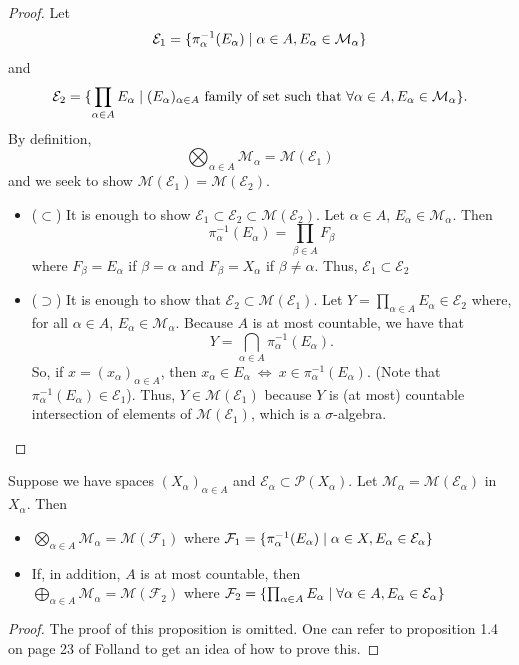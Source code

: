 \documentclass[11pt,leqno,oneside]{amsbook}
\numberwithin{thm}{section}
\renewcommand{\P}{\mathcal{P}} %
\newcommand{\M}{\mathcal{M}} %
\newcommand{\F}{\mathcal{F}}
\newcommand{\Ep}{\mathcal{E}} %
\newcommand{\s}{$\sigma$-} %
\begin{document}
\begin{proof}
  Let \[
    \Ep_1 = \{\pi_\alpha^{-1}(E_\alpha) \st \alpha \in A, E_\alpha
    \in \M_\alpha\}
  \]
  and \[
    \Ep_2 = \{\prod_{\alpha \in A} E_\alpha \st (E_\alpha)_{\alpha
      \in A} \text{ family of set such that } \forall \alpha \in A,
    E_\alpha \in \M_\alpha \}.
  \]
  By definition, \[
    \bigotimes_{\alpha \in A} \M_\alpha = \M(\Ep_1)
  \]
  and we seek to show $\M(\Ep_1) = \M(\Ep_2)$.
  \begin{itemize}
  \item ($\subset$) It is enough to show $\Ep_1 \subset \Ep_2 \subset
    \M(\Ep_2)$. Let $\alpha \in A$, $E_\alpha \in \M_\alpha$. Then \[
      \pi_\alpha^{-1}(E_\alpha) = \prod_{\beta \in A} F_\beta
    \]
    where $F_\beta = E_\alpha$ if $\beta = \alpha$ and $F_\beta =
    X_\alpha$ if $\beta \neq \alpha$. Thus, $\Ep_1 \subset \Ep_2$

  \item ($\supset$) It is enough to show that $\Ep_2 \subset
    \M(\Ep_1)$. Let $Y = \prod_{\alpha \in A} E_\alpha \in \Ep_2$
    where, for all $\alpha \in A$, $E_\alpha \in \M_\alpha$. Because
    $A$ is at most countable, we have that \[
      Y = \bigcap_{\alpha \in A} \pi_\alpha^{-1}(E_\alpha).
    \]
    So, if $x = (x_\alpha)_{\alpha \in A}$, then $x_\alpha \in
    E_\alpha \ \iff \ x \in
    \pi_\alpha^{-1}(E_\alpha)$. (Note that $\pi_\alpha^{-1}(E_\alpha)
    \in \Ep_1$). Thus, $Y \in \M(\Ep_1)$ because $Y$ is (at most) countable
    intersection of elements of $\M(\Ep_1)$, which is a \s algebra.
  \end{itemize}
\end{proof}
\begin{prop}
  Suppose we have spaces $(X_\alpha)_{\alpha \in A}$ and $\Ep_\alpha \subset
  \P(X_\alpha)$. Let $\M_\alpha = \M(\Ep_\alpha)$ in $X_\alpha$. Then
  \begin{itemize}
  \item $\bigotimes_{\alpha \in A} \M_\alpha = \M(\F_1)$ where $\F_1 =
    \{\pi_\alpha^{-1}(E_\alpha) \st \alpha \in X, E_\alpha \in \Ep_\alpha\}$
  \item If, in addition, $A$ is at most countable, then \\
  $\bigoplus_{\alpha \in A} \M_\alpha = \M(\F_2)$ where $\F_2 = \{\prod_{\alpha \in A} E_\alpha \st \forall \alpha
    \in A, E_\alpha \in \Ep_\alpha\}$
  \end{itemize}
\end{prop}
\begin{proof}
  The proof of this proposition is omitted. One can refer to
  proposition 1.4 on page 23 of Folland to get an idea of how to prove this.
\end{proof}
\end{document}
